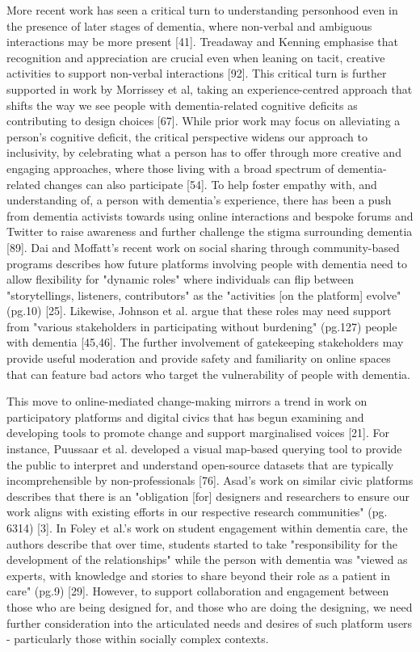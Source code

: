 More recent work has seen a critical turn to understanding personhood even in the presence of later stages of dementia, where non-verbal and ambiguous interactions may be more present [41]. Treadaway and Kenning emphasise that recognition and appreciation are crucial even when leaning on tacit, creative activities to support non-verbal interactions [92]. This critical turn is further supported in work by Morrissey et al, taking an experience-centred approach that shifts the way we see people with dementia-related cognitive deficits as contributing to design choices [67]. While prior work may focus on alleviating a person's cognitive deficit, the critical perspective widens our approach to inclusivity, by celebrating what a person has to offer through more creative and engaging approaches, where those living with a broad spectrum of dementia-related changes can also participate [54].
To help foster empathy with, and understanding of, a person with dementia's experience, there has been a push from dementia activists towards using online interactions and bespoke forums and Twitter to raise awareness and further challenge the stigma surrounding dementia [89]. Dai and Moffatt’s recent work on social sharing through community-based programs describes how future platforms involving people with dementia need to allow flexibility for "dynamic roles" where individuals can flip between "storytellings, listeners, contributors" as the "activities [on the platform] evolve" (pg.10) [25]. Likewise, Johnson et al. argue that these roles may need support from "various stakeholders in participating without burdening" (pg.127) people with dementia [45,46]. The further involvement of gatekeeping stakeholders may provide useful moderation and provide safety and familiarity on online spaces that can feature bad actors who target the vulnerability of people with dementia. 

This move to online-mediated change-making mirrors a trend in work on participatory platforms and digital civics that has begun examining and developing tools to promote change and support marginalised voices [21]. For instance, Puussaar et al. developed a visual map-based querying tool to provide the public to interpret and understand open-source datasets that are typically incomprehensible by non-professionals [76]. Asad’s work on similar civic platforms describes that there is an "obligation [for] designers and researchers to ensure our work aligns with existing efforts in our respective research communities" (pg. 6314) [3]. In Foley et al.'s work on student engagement within dementia care, the authors describe that over time, students started to take "responsibility for the development of the relationships" while the person with dementia was "viewed as experts, with knowledge and stories to share beyond their role as a patient in care" (pg.9) [29]. However, to support collaboration and engagement between those who are being designed for, and those who are doing the designing, we need further consideration into the articulated needs and desires of such platform users - particularly those within socially complex contexts. 

